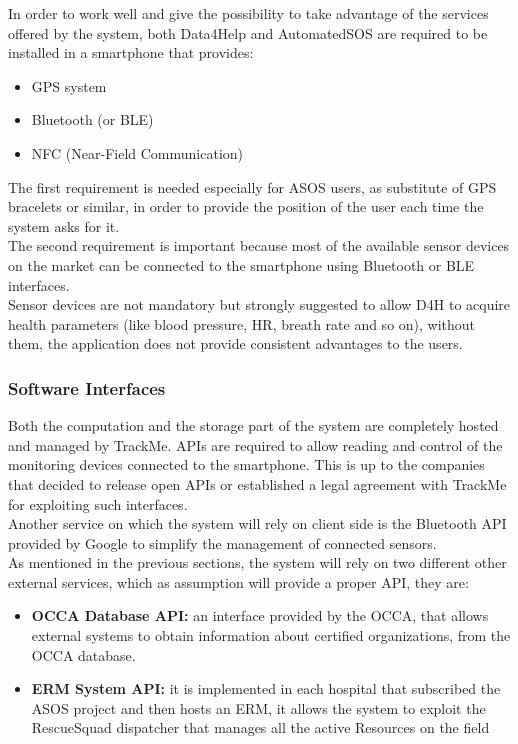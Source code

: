 In order to work well and give the possibility to take advantage of the services offered by the system, both Data4Help and AutomatedSOS are required to be installed in a smartphone that provides:
\begin{itemize}
	\item GPS system
	\item Bluetooth (or BLE)
	\item NFC (Near-Field Communication)
\end{itemize} 
The first requirement is needed especially for ASOS users, as substitute of GPS bracelets or similar, in order to provide the position of the user each time the system asks for it.\\
The second requirement is important because most of the available sensor devices on the market can be connected to the smartphone using Bluetooth or BLE interfaces.\\
Sensor devices are not mandatory but strongly suggested to allow D4H to acquire health parameters (like blood pressure, HR, breath rate and so on), without them, the application does not provide consistent advantages to the users. 


{\color{Blue}\subsubsection{Software Interfaces}}
Both the computation and the storage part of the system are completely hosted and managed by TrackMe. APIs are required to allow reading and control of the monitoring devices connected to the smartphone. This is up to the companies that decided to release open APIs or established a legal agreement with TrackMe for exploiting such interfaces.\\
Another service on which the system will rely on client side is the Bluetooth API provided by Google to simplify the management of connected sensors.\\
As mentioned in the previous sections, the system will rely on two different other external services, which as assumption will provide a proper API, they are:
\begin{itemize}
	\item \textbf{OCCA Database API:} an interface provided by the OCCA, that allows external systems to obtain information about certified organizations, from the OCCA database.
	\item \textbf{ERM System API:} it is implemented in each hospital that subscribed the ASOS project and then hosts an ERM, it allows the system to exploit the RescueSquad dispatcher that manages all the active Resources on the field 
\end{itemize}


